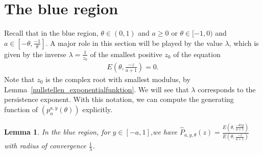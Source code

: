 \documentclass[12pt]{article}
\newcommand{\1}{\mathds{1}}
\theoremstyle{definition}
\theoremstyle{plain}
\newtheorem{Lemma}[definition]{Lemma}
\theoremstyle{remark}
\begin{document}
\section{The blue region}\label{blue_region}
Recall that in the blue region, $\theta\in(0,1)$ and $a\geq 0$ or $\theta\in[-1,0)$ and   $a\in[-\theta,\frac{-1}{\theta}]$. 
A major role in this section will be played by the value $\lambda$, which is given by the inverse $\lambda=\frac{1}{z_0}$ of the smallest positive $z_0$ of the equation
\begin{align}\label{root_blue}
    E\left(\theta,\frac{-z}{a+1}\right)=0.
\end{align}
Note that $z_0$ is the complex root with smallest modulus, by Lemma~\ref{nullstellen_exponentialfunktion}. We will see that $\lambda$ corresponds to the persistence exponent.
With this notation, we can compute the generating function of $(p_n^{a,y}(\theta))$ explicitly.
\begin{Lemma}\label{generatingfunction_blaue_region}
   In the blue region, for $y\in[-a,1]$,we have $\hat{P}_{a,y,\theta}(z)=\frac{E\left(\theta,\frac{-\theta zy}{a+1}\right)}{E\left(\theta,\frac{-z}{a+1}\right)}$ with radius of convergence $\frac{1}{\lambda}$.
\end{Lemma}
\end{document}
